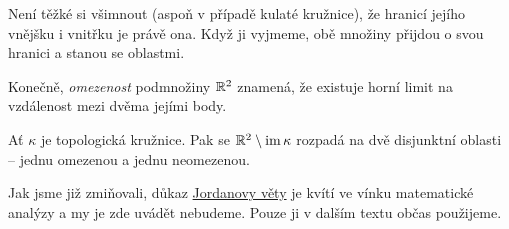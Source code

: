 Není těžké si všimnout (aspoň v případě kulaté kružnice), že hranicí jejího
vnějšku i vnitřku je právě ona. Když ji vyjmeme, obě množiny přijdou o svou
hranici a stanou se oblastmi.

Konečně, \emph{omezenost} podmnožiny $\mathbb{R}^2$ znamená, že existuje horní limit na
vzdálenost mezi dvěma jejími body.

\begin{theorem}
 \label{thm:jordanova-o-kruznici}
 Ať $\kappa$ je topologická kružnice. Pak se $\mathbb{R}^2 \setminus \operatorname{im} \kappa$
 rozpadá na dvě disjunktní oblasti -- jednu omezenou a jednu neomezenou.
\end{theorem}

Jak jsme již zmiňovali, důkaz \hyperref[thm:jordanova-o-kruznici]{Jordanovy
věty} je kvítí ve vínku matematické analýzy a my je zde uvádět nebudeme. Pouze
ji v dalším textu občas použijeme.

